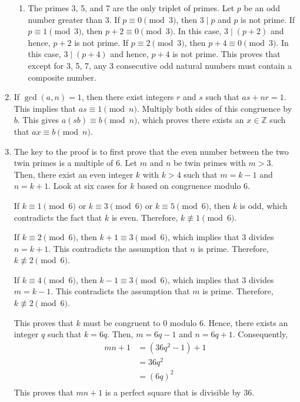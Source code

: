 \begin{enumerate}
\begin{enumerate}
\item The primes 3, 5, and 7 are the only triplet of primes.  Let $p$ be an odd number greater than 3.  If $p \equiv 0 \pmod 3$, then $3 \mid p$ and $p$ is not prime.  If $p \equiv 1 \pmod 3$, then $p + 2 \equiv 0 \pmod 3$.  In this case, $3 \mid \left( p + 2 \right)$ and hence, $p + 2$ is not prime.  If $p \equiv 2 \pmod 3$, then $p + 4 \equiv 0 \pmod 3$.  In this case, 
$3 \mid \left( p + 4 \right)$ and hence, $p + 4$ is not prime.  This proves that except for 3, 5, 7, any 3 consecutive odd natural numbers must contain a composite number.
\end{enumerate}

\item If $\gcd \left( a, n \right) = 1$, then there exist integers $r$ and $s$ such that 
$as + nr = 1$.  This implies that $as \equiv 1 \pmod n$.  Multiply both sides of this congruence by $b$.  This gives $a \left( sb \right) \equiv b \pmod n$, which proves there exists an 
$x \in \mathbb{Z}$ such that $ax \equiv b \pmod n$.

\item The key to the proof is to first prove that the even number between the two twin primes is a multiple of 6.  Let $m$ and $n$ be twin primes with $m > 3$.  Then, there exist an even integer 
$k$ with $k >4$ such that $m = k - 1$ and $n = k + 1$.  Look at six cases for $k$ based on congruence modulo 6.

If $k \equiv 1 \pmod 6$ or  $k \equiv 3 \pmod 6$ or $k \equiv 5 \pmod 6$, then $k$ is odd, which contradicts the fact that $k$ is even.  Therefore, $k \not \equiv 1 \pmod 6$.

If $k \equiv 2 \pmod 6$, then $k + 1 \equiv 3 \pmod 6$, which implies that 3 divides $n = k + 1$.  This contradicts the assumption that $n$ is prime.  Therefore, $k \not \equiv 2 \pmod 6$.

If $k \equiv 4 \pmod 6$, then $k - 1 \equiv 3 \pmod 6$, which implies that 3 divides $m = k - 1$.  This contradicts the assumption that $m$ is prime.  Therefore, $k \not \equiv 2 \pmod 6$.

This proves that $k$ must be congruent to 0 modulo 6. Hence, there exists an integer $q$ such that 
$k = 6q$.  Then, $m = 6q - 1$ and $n = 6q + 1$.  Consequently,
\[
\begin{aligned}
mn + 1 &= \left( 36q^2 -1 \right) + 1 \\
       &= 36q^2 \\
       &= \left( 6q \right)^2 \\
\end{aligned}
\]
This proves that $mn + 1$ is a perfect square that is divisible by 36.
\end{enumerate}
\hbreak
\endinput


